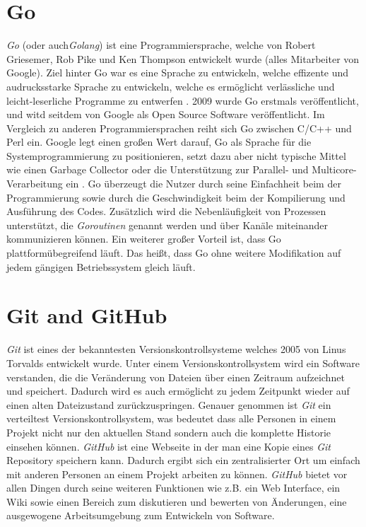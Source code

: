 \section{Go}
\textit{Go} (oder auch\textit{Golang}) ist eine Programmiersprache, welche von
Robert Griesemer, Rob Pike und Ken Thompson entwickelt wurde (alles Mitarbeiter
von Google). Ziel hinter Go war es eine Sprache zu entwickeln, welche effizente
und audrucksstarke Sprache zu entwickeln, welche es ermöglicht verlässliche und
leicht-leserliche Programme zu entwerfen \autocite{donovan_kernighan_2016}.
2009 wurde Go erstmals veröffentlicht, und witd seitdem von Google als Open Source
Software veröffentlicht. \newline
Im Vergleich zu anderen Programmiersprachen reiht sich Go zwischen C/C++ und
Perl ein. Google legt einen großen Wert darauf, Go als Sprache für die
Systemprogrammierung zu positionieren, setzt dazu aber nicht typische Mittel
wie einen Garbage Collector oder die Unterstützung zur Parallel- und
Multicore-Verarbeitung ein \autocite{feike_blass_2012}. Go überzeugt die Nutzer
durch seine Einfachheit beim der Programmierung sowie durch die Geschwindigkeit beim
der Kompilierung und Ausführung des Codes. Zusätzlich wird die Nebenläufigkeit von
Prozessen unterstützt, die \textit{Goroutinen} genannt werden und über Kanäle
miteinander kommunizieren können. 
Ein weiterer großer Vorteil ist, dass Go plattformübegreifend läuft. Das heißt,
dass Go ohne weitere Modifikation auf jedem gängigen Betriebssystem gleich
läuft.
\autocite{donovan_kernighan_2016}


\section{Git and GitHub}
\textit{Git} ist eines der bekanntesten Versionskontrollsysteme welches 2005
von Linus Torvalds entwickelt wurde. Unter einem Versionskontrollsystem wird
ein Software verstanden, die die Veränderung von Dateien über einen Zeitraum
aufzeichnet und speichert. Dadurch wird es auch ermöglicht zu jedem Zeitpunkt
wieder auf einen alten Dateizustand zurückzuspringen.  Genauer genommen ist
\textit{Git} ein verteiltest Versionskontrollsystem, was bedeutet dass alle
Personen in einem  Projekt nicht nur den aktuellen Stand sondern auch die
komplette Historie einsehen können. \autocite{preissel_stachmann_2017}
\newline
\newline
\textit{GitHub} ist eine Webseite in der man eine Kopie eines \textit{Git}
Repository speichern kann. Dadurch ergibt sich ein zentralisierter Ort um
einfach mit anderen Personen an einem Projekt  arbeiten zu können.
\textit{GitHub} bietet vor allen Dingen durch seine weiteren Funktionen wie
z.B. ein Web Interface, ein Wiki sowie einen Bereich zum diskutieren und
bewerten von Änderungen, eine ausgewogene Arbeitsumgebung zum Entwickeln von
Software. \autocite{bell_2014}
